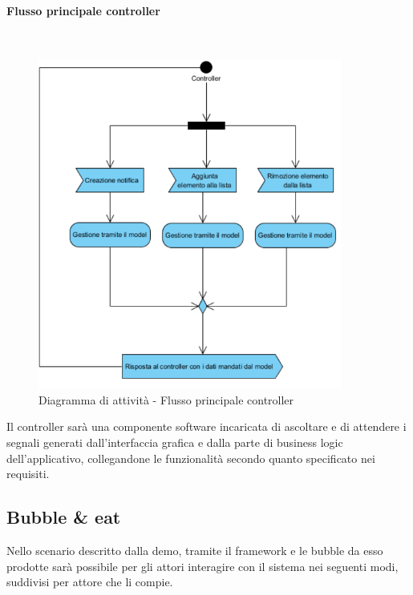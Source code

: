 \paragraph{Flusso principale controller}\mbox{}\\
\nopagebreak
\begin{figure}[H]
	\centering
	\includegraphics[width=10cm]{../../documenti/SpecificaTecnica/diagrammi_img/attivita/controllermainflow.png}
	\caption{Diagramma di attività - Flusso principale controller}
\end{figure}


Il controller sarà una componente software incaricata di ascoltare e di attendere i segnali generati dall'interfaccia grafica e dalla parte di business logic dell'applicativo, collegandone le funzionalità secondo quanto specificato nei requisiti. 

\subsection{Bubble \& eat}
Nello scenario descritto dalla demo, tramite il framework e le bubble da esso prodotte sarà possibile per gli attori interagire con il sistema nei seguenti modi, suddivisi per attore che li compie.

\subsubsection{\Customer{}}

